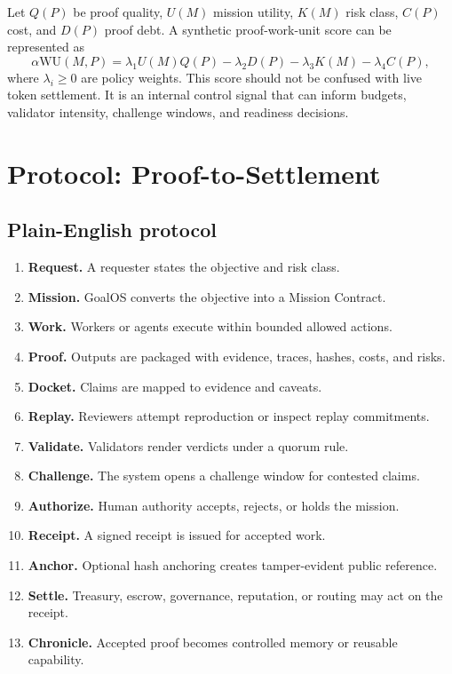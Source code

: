 \documentclass[11pt]{article}
\begin{document}
Let $Q(P)$ be proof quality, $U(M)$ mission utility, $K(M)$ risk class, $C(P)$ cost, and $D(P)$ proof debt. A synthetic proof-work-unit score can be represented as
\[
  \alpha\mathrm{WU}(M,P)=\lambda_1 U(M)Q(P)-\lambda_2 D(P)-\lambda_3 K(M)-\lambda_4 C(P),
\]
where $\lambda_i\geq0$ are policy weights. This score should not be confused with live token settlement. It is an internal control signal that can inform budgets, validator intensity, challenge windows, and readiness decisions.

\section{Protocol: Proof-to-Settlement}

\subsection{Plain-English protocol}

\begin{enumerate}
  \item \textbf{Request.} A requester states the objective and risk class.
  \item \textbf{Mission.} GoalOS converts the objective into a Mission Contract.
  \item \textbf{Work.} Workers or agents execute within bounded allowed actions.
  \item \textbf{Proof.} Outputs are packaged with evidence, traces, hashes, costs, and risks.
  \item \textbf{Docket.} Claims are mapped to evidence and caveats.
  \item \textbf{Replay.} Reviewers attempt reproduction or inspect replay commitments.
  \item \textbf{Validate.} Validators render verdicts under a quorum rule.
  \item \textbf{Challenge.} The system opens a challenge window for contested claims.
  \item \textbf{Authorize.} Human authority accepts, rejects, or holds the mission.
  \item \textbf{Receipt.} A signed receipt is issued for accepted work.
  \item \textbf{Anchor.} Optional hash anchoring creates tamper-evident public reference.
  \item \textbf{Settle.} Treasury, escrow, governance, reputation, or routing may act on the receipt.
  \item \textbf{Chronicle.} Accepted proof becomes controlled memory or reusable capability.
\end{enumerate}
\end{document}
